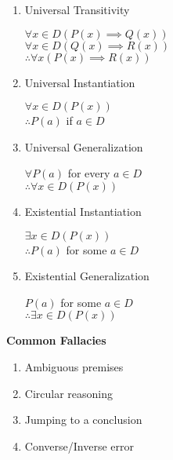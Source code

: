 \documentclass[landscape, a4paper]{article}
\begin{document}
\begin{multicols*}{4}
\begin{enumerate}[wide, labelindent=2pt]
{              }
        \item Universal Transitivity
              \par {\centering
                  $\forall x\in D (P(x)\implies Q(x))$        \\
                  $\forall x\in D (Q(x)\implies R(x))$        \\
                  $\therefore \forall x (P(x)\implies R(x))$ \par
              }
        \item Universal Instantiation
              \par {\centering
                  $\forall x\in D(P(x))$        \\
                  $\therefore P(a)$ if $a\in D$ \par
              }
        \item Universal Generalization
              \par {\centering
                  $\forall P(a)$ for every $a\in D$        \\
                  $\therefore \forall x\in D (P(x))$ \par
              }
        \item Existential Instantiation
              \par {\centering
                  $\exists x\in D (P(x))$        \\
                  $\therefore P(a)$ for some $a\in D$ \par
              }
        \item Existential Generalization
              \par {\centering
                  $P(a)$ for some $a\in D$        \\
                  $\therefore \exists x\in D (P(x))$ \par
              }
    \end{enumerate}

    \noindent\textbf{Common Fallacies}
    \begin{enumerate}[wide, labelindent=2pt]
        \item Ambiguous premises
        \item Circular reasoning
        \item Jumping to a conclusion
        \item Converse/Inverse error
    \end{enumerate}


\end{multicols*}
\end{document}
